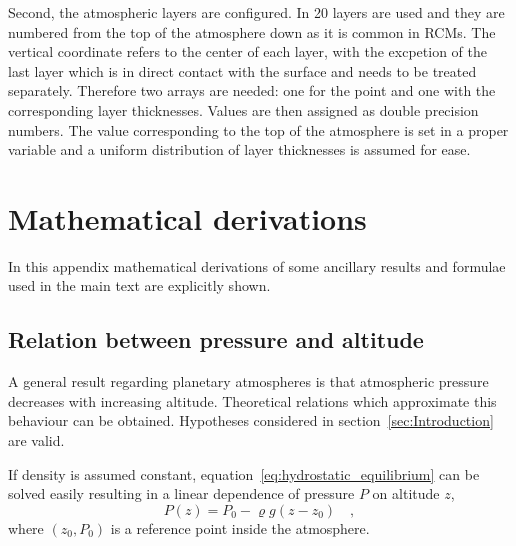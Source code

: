 \documentclass[a4paper,10pt,twocolumn,\classoptions]{article}
\begin{document}
Second, the atmospheric layers are configured. In \cite{TTAPS-I} 20 layers are used and they are numbered from the top of the atmosphere down as it is common in RCMs. The vertical coordinate refers to the center of each layer, with the excpetion of the last layer which is in direct contact with the surface and needs to be treated separately. %
Therefore two arrays are needed: one for the point and one with the corresponding layer thicknesses. Values are then assigned as double precision numbers. The value corresponding to the top of the atmosphere is set in a proper variable and a uniform distribution of layer thicknesses is assumed for ease.


\twocolumn



\section{Mathematical derivations}
In this appendix mathematical derivations of some ancillary results and formulae used in the main text are explicitly shown.



\subsection{Relation between pressure and altitude}
\label{sec:Relation between pressure and altitude}
A general result regarding planetary atmospheres is that atmospheric pressure decreases with increasing altitude. Theoretical relations which approximate this behaviour can be obtained. Hypotheses considered in section~\ref{sec:Introduction} are valid.

If density is assumed constant, equation~\eqref{eq:hydrostatic_equilibrium} can be solved easily resulting in a linear dependence of pressure $P$ on altitude $z$,
\begin{equation}
  \label{eq:pressure_constant_density}
  P(z) = P_0 - \varrho g (z - z_0)
  \quad ,
\end{equation}
where $(z_0, P_0)$ is a reference point inside the atmosphere.
\end{document}
